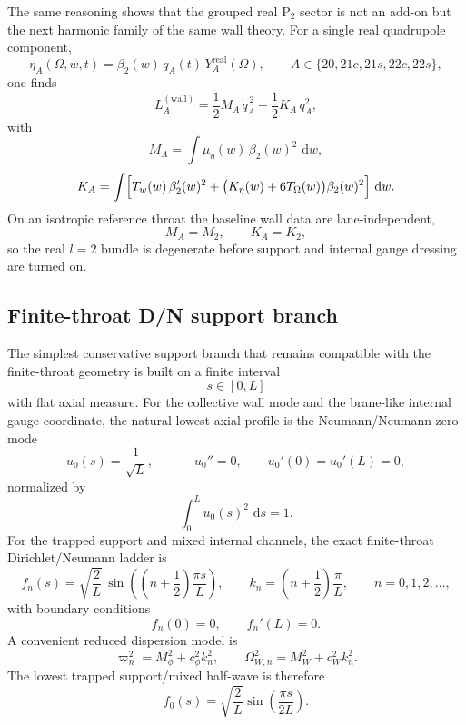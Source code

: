 \documentclass[11pt]{article}
\theoremstyle{definition}
\newcommand{\dd}{\,\mathrm{d}}
\newcommand{\Ptwo}{\ensuremath{\mathrm{P}_2}}
\begin{document}
The same reasoning shows that the grouped real $\Ptwo$ sector is not an add-on but the next harmonic family of the same wall theory. For a single real quadrupole component,
\begin{equation}
\eta_A(\Omega,w,t)=\beta_2(w)\,q_A(t)\,Y_A^{\mathrm{real}}(\Omega),
\qquad
A\in\{20,21c,21s,22c,22s\},
\label{eq:reduced-p2-ansatz}
\end{equation}
one finds
\begin{equation}
L_A^{(\mathrm{wall})}
=
\frac12 M_A\,\dot q_A^{\,2}
-
\frac12 K_A\,q_A^2,
\label{eq:reduced-p2-wall-lagrangian}
\end{equation}
with
\begin{equation}
M_A=\int \mu_\eta(w)\,\beta_2(w)^2\,\dd w,
\label{eq:reduced-p2-mass}
\end{equation}
\begin{equation}
K_A=\int
\Bigl[
T_w(w)\,\beta_2'(w)^2
+
\bigl(K_\eta(w)+6T_\Omega(w)\bigr)\beta_2(w)^2
\Bigr]\,\dd w.
\label{eq:reduced-p2-stiffness}
\end{equation}
On an isotropic reference throat the baseline wall data are lane-independent,
\[
M_A=M_2,
\qquad
K_A=K_2,
\]
so the real $l=2$ bundle is degenerate before support and internal gauge dressing are turned on.

\subsection{Finite-throat D/N support branch}

The simplest conservative support branch that remains compatible with the finite-throat geometry is built on a finite interval
\[
s\in[0,L]
\]
with flat axial measure. For the collective wall mode and the brane-like internal gauge coordinate, the natural lowest axial profile is the Neumann/Neumann zero mode
\begin{equation}
u_0(s)=\frac{1}{\sqrt L},
\qquad
-u_0''=0,
\qquad
u_0'(0)=u_0'(L)=0,
\label{eq:reduced-u0}
\end{equation}
normalized by
\[
\int_0^L u_0(s)^2\,\dd s=1.
\]
For the trapped support and mixed internal channels, the exact finite-throat Dirichlet/Neumann ladder is
\begin{equation}
f_n(s)=\sqrt{\frac{2}{L}}\,
\sin\!\left(\left(n+\frac12\right)\frac{\pi s}{L}\right),
\qquad
k_n=\left(n+\frac12\right)\frac{\pi}{L},
\qquad n=0,1,2,\dots,
\label{eq:reduced-dn-ladder}
\end{equation}
with boundary conditions
\[
f_n(0)=0,
\qquad
f_n'(L)=0.
\]
A convenient reduced dispersion model is
\begin{equation}
\varpi_n^2=M_\phi^2+c_\phi^2 k_n^2,
\qquad
\Omega_{W,n}^2=M_W^2+c_W^2 k_n^2.
\label{eq:reduced-dn-frequencies}
\end{equation}
The lowest trapped support/mixed half-wave is therefore
\begin{equation}
f_0(s)=\sqrt{\frac{2}{L}}\sin\!\left(\frac{\pi s}{2L}\right).
\label{eq:reduced-dn-ground}
\end{equation}
\end{document}
